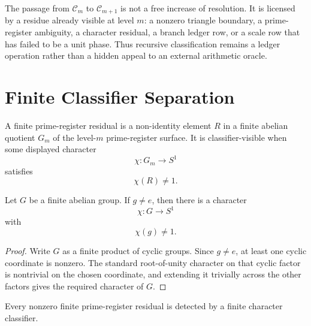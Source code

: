 \begin{principle}
\label{prin:rh-smooth-prime-classifiers-refine-visible-residues}
The passage from $\mathcal C_m$ to $\mathcal C_{m+1}$ is not a free
increase of resolution.  It is licensed by a residue already visible at
level $m$: a nonzero triangle boundary, a prime-register ambiguity, a
character residual, a branch ledger row, or a scale row that has failed
to be a unit phase.  Thus recursive classification remains a ledger
operation rather than a hidden appeal to an external arithmetic oracle.
\end{principle}

\section{Finite Classifier Separation}
\label{sec:rh-smooth-prime-finite-classifier-separation}

\begin{definition}
\label{def:rh-finite-prime-register-residual}
A finite prime-register residual is a non-identity element $R$ in a
finite abelian quotient $G_m$ of the level-$m$ prime-register surface.
It is classifier-visible when some displayed character
$$
\chi:G_m\to S^1
$$
satisfies
$$
\chi(R)\ne1.
$$
\end{definition}

\begin{theorem}
\label{thm:rh-finite-character-separation}
Let $G$ be a finite abelian group.  If $g\ne e$, then there is a
character
$$
\chi:G\to S^1
$$
with
$$
\chi(g)\ne1.
$$
\end{theorem}

\begin{proof}
Write $G$ as a finite product of cyclic groups.  Since $g\ne e$, at
least one cyclic coordinate is nonzero.  The standard root-of-unity
character on that cyclic factor is nontrivial on the chosen coordinate,
and extending it trivially across the other factors gives the required
character of $G$.
\end{proof}

\begin{corollary}
\label{cor:rh-finite-residuals-cannot-hide-from-classifiers}
Every nonzero finite prime-register residual is detected by a finite
character classifier.
\end{corollary}

